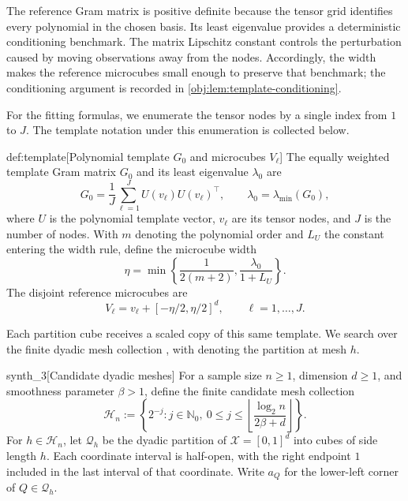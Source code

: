 \documentclass[11pt]{article}
\begin{document}
The reference Gram matrix  is positive definite because the tensor grid identifies every polynomial in the chosen basis. Its least eigenvalue  provides a deterministic conditioning benchmark. The matrix Lipschitz constant  controls the perturbation caused by moving observations away from the nodes. Accordingly, the width  makes the reference microcubes  small enough to preserve that benchmark; the conditioning argument is recorded in \cref{obj:lem:template-conditioning}.

For the fitting formulas, we enumerate the tensor nodes by a single index from \(1\) to \(J\). The template notation under this enumeration is collected below.

\begin{definitionv}{def:template}[Polynomial template $G_0$ and microcubes $V_\ell$]
The equally weighted template Gram matrix \(G_0\) and its least eigenvalue \(\lambda_0\) are
\[
G_0=\frac{1}{J}\sum_{\ell=1}^{J}U(v_\ell)U(v_\ell)^\top,
\qquad
\lambda_0=\lambda_{\min}(G_0),
\]
where \(U\) is the polynomial template vector, \(v_\ell\) are its tensor nodes, and \(J\) is the number of nodes. With \(m\) denoting the polynomial order and \(L_U\) the constant entering the width rule, define the microcube width
\[
\eta=\min\left\{\frac{1}{2(m+2)},\frac{\lambda_0}{1+L_U}\right\}.
\]
The disjoint reference microcubes are
\[
V_\ell=v_\ell+[-\eta/2,\eta/2]^d,
\qquad \ell=1,\ldots,J.
\]
\end{definitionv}

Each partition cube receives a scaled copy of this same template. We search over the finite dyadic mesh collection , with  denoting the partition at mesh \(h\).

\begin{definitionv}{synth_3}[Candidate dyadic meshes]
For a sample size \(n\ge1\), dimension \(d\ge1\), and smoothness parameter \(\beta>1\), define the finite candidate mesh collection
\[
\mathcal H_n:=
\left\{2^{-j}:j\in\mathbb N_0,\ 
0\le j\le
\left\lfloor\frac{\log_2 n}{2\beta+d}\right\rfloor
\right\}.
\]
For \(h\in\mathcal H_n\), let \(\mathcal Q_h\) be the dyadic partition of
\(\mathcal X=[0,1]^d\) into cubes of side length \(h\). Each coordinate interval is half-open, with the right endpoint \(1\) included in the last interval of that coordinate. Write \(a_Q\) for the lower-left corner of \(Q\in\mathcal Q_h\).
\end{definitionv}
\end{document}
